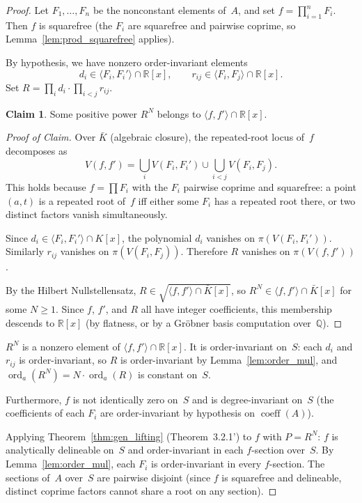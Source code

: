 \documentclass[11pt]{article}
\theoremstyle{plain}
\theoremstyle{definition}
\newtheorem*{claim}{Claim}
\newcommand{\R}{\mathbb{R}}
\newcommand{\Q}{\mathbb{Q}}
\DeclareMathOperator{\ord}{ord}
\DeclareMathOperator{\coeff}{coeff}
\begin{document}
\begin{proof}
Let $F_1, \ldots, F_n$ be the nonconstant elements of~$A$, and set
$f = \prod_{i=1}^{n} F_i$.  Then $f$ is squarefree (the $F_i$ are
squarefree and pairwise coprime, so
Lemma~\ref{lem:prod_squarefree} applies).

By hypothesis, we have nonzero order-invariant elements
\[
  d_i \in \langle F_i, F_i' \rangle \cap \R[x], \qquad
  r_{ij} \in \langle F_i, F_j \rangle \cap \R[x].
\]
Set $R = \prod_i d_i \cdot \prod_{i < j} r_{ij}$.

\begin{claim}
Some positive power $R^N$ belongs to
$\langle f, f' \rangle \cap \R[x]$.
\end{claim}

\begin{proof}[Proof of Claim]
Over $\bar{K}$ (algebraic closure), the repeated-root locus of~$f$
decomposes as
\[
  V(f, f') = \bigcup_i V(F_i, F_i') \cup \bigcup_{i < j} V(F_i, F_j).
\]
This holds because $f = \prod F_i$ with the $F_i$ pairwise coprime and
squarefree: a point $(a, t)$ is a repeated root of~$f$ iff either some
$F_i$ has a repeated root there, or two distinct factors vanish
simultaneously.

Since $d_i \in \langle F_i, F_i' \rangle \cap K[x]$, the polynomial $d_i$
vanishes on $\pi(V(F_i, F_i'))$.  Similarly $r_{ij}$ vanishes on
$\pi(V(F_i, F_j))$.  Therefore $R$ vanishes on
$\pi(V(f, f'))$.

By the Hilbert Nullstellensatz,
$R \in \sqrt{\langle f, f' \rangle \cap \bar{K}[x]}$,
so $R^N \in \langle f, f' \rangle \cap \bar{K}[x]$ for some $N \ge 1$.
Since $f$, $f'$, and $R$ all have integer coefficients, this membership
descends to $\R[x]$ (by flatness, or by a Gr\"obner basis computation
over~$\Q$).
\end{proof}

$R^N$ is a nonzero element of $\langle f, f' \rangle \cap \R[x]$.  It is
order-invariant on~$S$: each $d_i$ and $r_{ij}$ is order-invariant, so
$R$ is order-invariant by Lemma~\ref{lem:order_mul}, and
$\ord_a(R^N) = N \cdot \ord_a(R)$ is constant on~$S$.

Furthermore, $f$ is not identically zero on~$S$ and is degree-invariant
on~$S$ (the coefficients of each $F_i$ are order-invariant by hypothesis
on $\coeff(A)$).

Applying Theorem~\ref{thm:gen_lifting} (Theorem~3.2.1') to $f$ with
$P = R^N$: $f$ is analytically delineable on~$S$ and order-invariant in
each $f$-section over~$S$.  By Lemma~\ref{lem:order_mul}, each $F_i$ is
order-invariant in every $f$-section.  The sections of~$A$ over~$S$ are
pairwise disjoint (since $f$ is squarefree and delineable, distinct
coprime factors cannot share a root on any section).
\end{proof}
\end{document}
